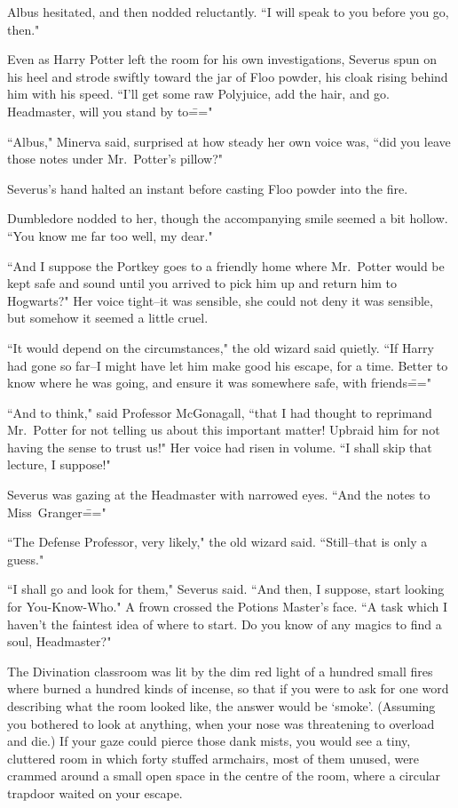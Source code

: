 Albus hesitated, and then nodded reluctantly. ``I will speak to you before you go, then."

\later

Even as Harry Potter left the room for his own investigations, Severus spun on his heel and strode swiftly toward the jar of Floo powder, his cloak rising behind him with his speed. ``I'll get some raw Polyjuice, add the hair, and go. Headmaster, will you stand by to\==="

``Albus," Minerva said, surprised at how steady her own voice was, ``did you leave those notes under Mr.~Potter's pillow?"

Severus's hand halted an instant before casting Floo powder into the fire.

Dumbledore nodded to her, though the accompanying smile seemed a bit hollow. ``You know me far too well, my dear."

``And I suppose the Portkey goes to a friendly home where Mr.~Potter would be kept safe and sound until you arrived to pick him up and return him to Hogwarts?" Her voice tight\---it was sensible, she could not deny it was sensible, but somehow it seemed a little cruel.

``It would depend on the circumstances," the old wizard said quietly. ``If Harry had gone so far\---I might have let him make good his escape, for a time. Better to know where he was going, and ensure it was somewhere safe, with friends\==="

``And to think," said Professor McGonagall, ``that I had thought to reprimand Mr.~Potter for not telling us about this important matter! Upbraid him for not having the sense to trust us!" Her voice had risen in volume. ``I shall skip that lecture, I suppose!"

Severus was gazing at the Headmaster with narrowed eyes. ``And the notes to Miss~Granger\==="

``The Defense Professor, very likely," the old wizard said. ``Still\---that is only a guess."

``I shall go and look for them," Severus said. ``And then, I suppose, start looking for You-Know-Who." A frown crossed the Potions Master's face. ``A task which I haven't the faintest idea of where to start. Do you know of any magics to find a soul, Headmaster?"

\later

The Divination classroom was lit by the dim red light of a hundred small fires where burned a hundred kinds of incense, so that if you were to ask for one word describing what the room looked like, the answer would be `smoke'. (Assuming you bothered to look at anything, when your nose was threatening to overload and die.) If your gaze could pierce those dank mists, you would see a tiny, cluttered room in which forty stuffed armchairs, most of them unused, were crammed around a small open space in the centre of the room, where a circular trapdoor waited on your escape.

